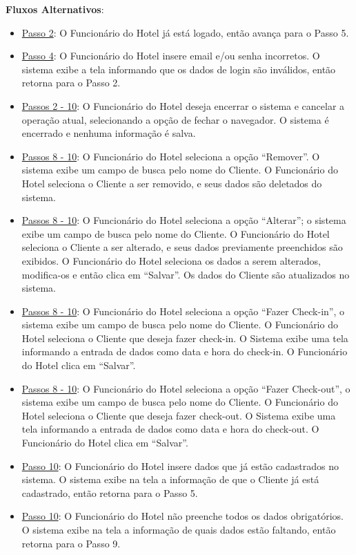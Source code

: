 \documentclass[notitlepage]{article}
\begin{document}
\textbf{Fluxos Alternativos}:\\
\begin{itemize}
\item \underline{Passo 2}: O Funcionário do Hotel já está logado, então avança para o Passo 5.
\item \underline{Passo 4}: O Funcionário do Hotel insere email e/ou senha incorretos. O sistema exibe a tela informando que os dados de login são inválidos, então retorna para o Passo 2.
\item \underline{Passos 2 - 10}: O Funcionário do Hotel deseja encerrar o sistema e cancelar a operação atual, selecionando a opção de fechar o navegador. O sistema é encerrado e nenhuma informação é salva. 
\item \underline{Passos 8 - 10}: O Funcionário do Hotel seleciona a opção “Remover”. O sistema exibe um campo de busca pelo nome do Cliente. O Funcionário do Hotel seleciona o Cliente a ser removido, e seus dados são deletados do sistema.  
\item \underline{Passos 8 - 10}: O Funcionário do Hotel seleciona a opção “Alterar”; o sistema exibe um campo de busca pelo nome do Cliente. O Funcionário do Hotel seleciona o Cliente a ser alterado, e seus dados previamente preenchidos são exibidos. O Funcionário do Hotel seleciona os dados a serem alterados, modifica-os e então clica em “Salvar”. Os dados do Cliente são atualizados no sistema.
\item \underline{Passos 8 - 10}: O Funcionário do Hotel seleciona a opção “Fazer Check-in”, o sistema exibe um campo de busca pelo nome do Cliente. O Funcionário do Hotel seleciona o Cliente que deseja fazer check-in. O Sistema exibe uma tela informando a entrada de dados como data e hora do check-in. O Funcionário do Hotel clica em “Salvar”. 
\item \underline{Passos 8 - 10}: O Funcionário do Hotel seleciona a opção “Fazer Check-out”, o sistema exibe um campo de busca pelo nome do Cliente. O Funcionário do Hotel seleciona o Cliente que deseja fazer check-out. O Sistema exibe uma tela informando a entrada de dados como data e hora do check-out. O Funcionário do Hotel clica em “Salvar”. 
\item \underline{Passo 10}: O Funcionário do Hotel insere dados que já estão cadastrados no sistema. O sistema exibe na tela a informação de que o Cliente já está cadastrado, então retorna para o Passo 5.
\item \underline{Passo 10}: O Funcionário do Hotel não preenche todos os dados obrigatórios. O sistema exibe na tela a informação de quais dados estão faltando, então retorna para o Passo 9.

\end{itemize}
\end{document}
